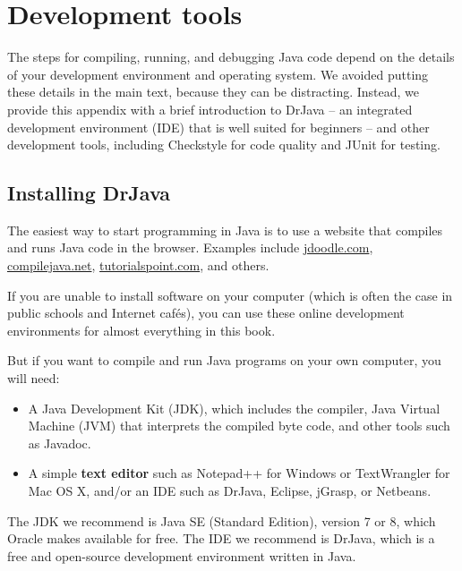 \documentclass[12pt]{book}
\theoremstyle{exercise}
\begin{document}
\appendix
\renewcommand{\chaptermark}[1]{\markboth{Appendix \thechapter ~~ #1}{}}


\chapter{Development tools}
\label{development}

The steps for compiling, running, and debugging Java code depend on the details of your development environment and operating system.
We avoided putting these details in the main text, because they can be distracting.
Instead, we provide this appendix with a brief introduction to DrJava -- an integrated development environment (IDE) that is well suited for beginners -- and other development tools, including Checkstyle for code quality and JUnit for testing.


\section{Installing DrJava}
\label{drjava}

The easiest way to start programming in Java is to use a website that compiles and runs Java code in the browser.
Examples include \url{jdoodle.com}, \url{compilejava.net}, \url{tutorialspoint.com}, and others.

If you are unable to install software on your computer (which is often the case in public schools and Internet caf\'{e}s), you can use these online development environments for almost everything in this book.

But if you want to compile and run Java programs on your own computer, you will need:


\begin{itemize}

\item A Java Development Kit (JDK), which includes the compiler, Java Virtual Machine (JVM) that interprets the compiled byte code, and other tools such as Javadoc.

\item A simple {\bf text editor} such as Notepad++ for Windows or TextWrangler for Mac OS X, and/or an IDE such as DrJava, Eclipse, jGrasp, or Netbeans.

\end{itemize}

The JDK we recommend is Java SE (Standard Edition), version 7 or 8, which Oracle makes available for free.
The IDE we recommend is DrJava, which is a free and open-source development environment written in Java.
\end{document}
